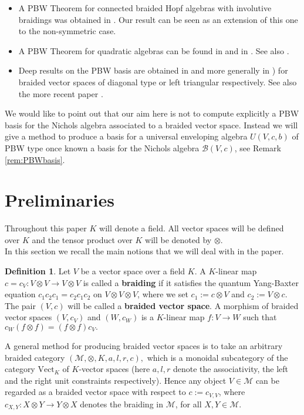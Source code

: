 \documentclass[english]{amsart}
\numberwithin{equation}{section}
\numberwithin{figure}{section}
\theoremstyle{plain}
\theoremstyle{definition}
\newtheorem{defn}[thm]{Definition}
\theoremstyle{definition}
\theoremstyle{remark}
\theoremstyle{remark}
\theoremstyle{plain}
\theoremstyle{plain}
\theoremstyle{plain}
\begin{document}
\begin{itemize}
\item A PBW Theorem for connected braided Hopf algebras with involutive braidings was obtained in \cite[Theorem 7.1]{Kharchenko- connected}. Our result can be seen as an extension of this one to the non-symmetric case.

\item A PBW Theorem for quadratic algebras can be found in \cite{Berger-ThequantumPBWThm} and in \cite{Braverman-Gaitsgory}. See also \cite[Theorem 3.9]{Ardizzoni-Stumbo-Qlie}.

\item Deep results on the PBW basis are obtained in \cite[Theorem 2]{Kherchenko-Aquantum} and more generally in \cite[Theorem 34]{Ufer}) for braided vector spaces of diagonal type or left triangular respectively. See also the more recent paper \cite{Helbig-APBWcriterion}.
\end{itemize}
We would like to point out that our aim here is not to compute explicitly a PBW basis for the Nichols algebra associated to a braided vector space. Instead we will give a method to produce a basis for a universal enveloping algebra $U(V,c,b)$ of PBW type once known a basis for the Nichols algebra $\mathcal{B}\left(V,c\right)$, see Remark \ref{rem:PBWbasis}. 








\section{Preliminaries\label{sec:prelim}}

Throughout this paper $K$ will denote a field. All vector spaces
will be defined over $K$ and the tensor product over $K$ will be
denoted by $\otimes$.\medskip{}
 \\
 In this section we recall the main notions that we will deal with
in the paper. 
\begin{defn}
Let $V$ be a vector space over a field $K$. A $K$-linear map $c=c_{V}:V\otimes V\rightarrow V\otimes V$
is called a \textbf{braiding} if it satisfies the quantum Yang-Baxter
equation $c_{1}c_{2}c_{1}=c_{2}c_{1}c_{2}$ on $V\otimes V\otimes V$,
where we set $c_{1}:=c\otimes V$ and $c_{2}:=V\otimes c.$ The pair
$\left(V,c\right)$ will be called a\textbf{ braided vector space}.
A morphism of braided vector spaces $(V,c_{V})$ and $(W,c_{W})$
is a $K$-linear map $f:V\rightarrow W$ such that $c_{W}(f\otimes f)=(f\otimes f)c_{V}.$ 
\end{defn}
A general method for producing braided vector spaces is to take an
arbitrary braided category $(\mathcal{M},\otimes,K,a,l,r,c),$ which
is a monoidal subcategory of the category $\mathrm{Vect}_{K}$ of
$K$-vector spaces (here $a,l,r$ denote the associativity, the left
and the right unit constraints respectively). Hence any object $V\in\mathcal{M}$
can be regarded as a braided vector space with respect to $c:=c_{V,V}$,
where $c_{X,Y}:X\otimes Y\rightarrow Y\otimes X$ denotes the braiding
in $\mathcal{M}$, for all $X,Y\in\mathcal{M}$.
\end{document}
